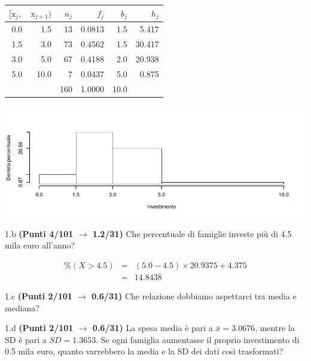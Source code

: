\documentclass[
  11pt,
]{book}
\theoremstyle{mytheoremstyle}
\theoremstyle{mydefstyle}
\newenvironment{sol}
  {
  \begin{tcolorbox}[enhanced,breakable,arc=0.1mm,boxrule=1pt,colback=white,colframe=iblue,
  title=\bf \fontfamily{lmss}\selectfont \hspace{.5 cm} Soluzione,drop fuzzy shadow]

}{
\end{tcolorbox}
  }
\begin{document}
\begin{sol}

\begin{table}[H]
\centering
\begin{tabular}{rrrrrr}
\toprule
$[\text{x}_j,$ & $\text{x}_{j+1})$ & $n_j$ & $f_j$ & $b_j$ & $h_j$\\
\midrule
0.0 & 1.5 & 13 & 0.0813 & 1.5 & 5.417\\
1.5 & 3.0 & 73 & 0.4562 & 1.5 & 30.417\\
3.0 & 5.0 & 67 & 0.4188 & 2.0 & 20.938\\
5.0 & 10.0 & 7 & 0.0437 & 5.0 & 0.875\\
 &  & 160 & 1.0000 & 10.0 & \\
\bottomrule
\end{tabular}
\end{table}

\begin{center}\includegraphics{Esami_passati_con_soluzioni_files/figure-latex/2023-109-1} \end{center}

\end{sol}

1.b \textbf{(Punti 4/101 \(\rightarrow\) 1.2/31)} Che percentuale di famiglie investe più di 4.5 mila euro all'anno?

\begin{sol}
\begin{eqnarray*}
  \%(X>4.5) &=&  (5.0-4.5)\times20.9375+4.375\\
  &=& 14.8438
\end{eqnarray*}

\end{sol}

1.c \textbf{(Punti 2/101 \(\rightarrow\) 0.6/31)} Che relazione dobbiamo aspettarci tra media e mediana?

1.d \textbf{(Punti 2/101 \(\rightarrow\) 0.6/31)} La spesa media è pari a \(\bar x=3.0676\), mentre la SD è pari a \(SD=1.3653\).
Se ogni famiglia aumentasse il proprio investimento di 0.5 mila euro, quanto varrebbero la media e la SD dei dati così trasformati?
\end{document}
